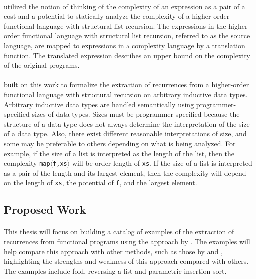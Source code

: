 \paragraph{}
\citet{Danner2013} utilized the notion of thinking of the complexity of an expression as a pair of a cost and a potential to statically analyze the complexity of a higher-order functional language with structural list recursion.
The expressions in the higher-order functional language with structural list recursion, referred to as the source language, are mapped to expressions in a complexity language by a translation function.
The translated expression describes an upper bound on the complexity of the original programs.

\paragraph{}
\citet{Danner2015} built on this work to formalize the extraction of recurrences from a higher-order functional language with structural recursion on arbitrary inductive data types.
Arbitrary inductive data types are handled semantically using programmer-specified sizes of data types.
Sizes must be programmer-specified because the structure of a data type does not always determine the interpretation of the size of a data type.
Also, there exist different reasonable interpretations of size, and some may be preferable to others depending on what is being analyzed.
For example, if the size of a list is interpreted as the length of the list, then the complexity \texttt{map$\langle$f,xs$\rangle$} will be order length of \texttt{xs}.
If the size of a list is interpreted as a pair of the length and its largest element, then the complexity will depend on the length of \texttt{xs}, the potential of \texttt{f}, and the largest element.


\subsection*{Proposed Work}

\paragraph{}
This thesis will focus on building a catalog of examples of the extraction of recurrences from functional programs using the approach by \citet{Danner2015}. The examples will help compare this approach with other methods, such as those by \citet{Avanzini2015} and \citet{HoffHof2010}, highlighting the strengths and weakness of this approach compared with others. The examples include fold, reversing a list and parametric insertion sort.

